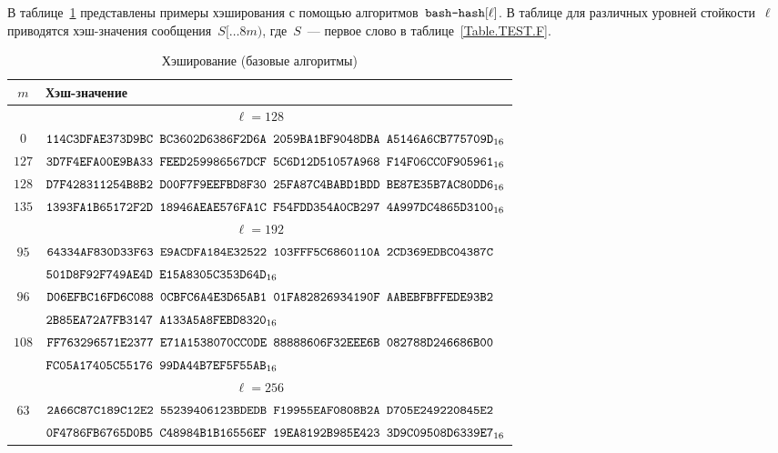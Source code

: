 \label{TEST.Hash}

В таблице~\ref{Table.TEST.Hash} представлены примеры хэширования
с помощью алгоритмов~$\texttt{bash-hash}[\ell]$.
%
В таблице для различных уровней стойкости~$\ell$ приводятся хэш-значения 
сообщения~$S[\dots 8m)$, где~$S$~--- первое слово в таблице~\ref{Table.TEST.F}.

\clearpage

\begin{table}[H]
\caption{Хэширование (базовые алгоритмы)}\label{Table.TEST.Hash}
\begin{tabular}{|c|l|}
\hline
$m$ & Хэш-значение\\
\hline
%
\hline
\multicolumn{2}{|c|}{$\ell=128$}\\
\hline
$0$ &
$\texttt{114C3DFAE373D9BC~BC3602D6386F2D6A~2059BA1BF9048DBA~A5146A6CB775709D}_{16}$\\
\hline
$127$ &
$\texttt{3D7F4EFA00E9BA33~FEED259986567DCF~5C6D12D51057A968~F14F06CC0F905961}_{16}$\\
\hline                                                        
$128$ &
$\texttt{D7F428311254B8B2~D00F7F9EEFBD8F30~25FA87C4BABD1BDD~BE87E35B7AC80DD6}_{16}$\\
\hline                                                        
$135$ &
$\texttt{1393FA1B65172F2D~18946AEAE576FA1C~F54FDD354A0CB297~4A997DC4865D3100}_{16}$\\
%
\hline
\hline
\multicolumn{2}{|c|}{$\ell=192$}\\
\hline
$95$ &
$\texttt{64334AF830D33F63~E9ACDFA184E32522~103FFF5C6860110A~2CD369EDBC04387C}$\\
&
$\texttt{501D8F92F749AE4D~E15A8305C353D64D}_{16}$\\
\hline
$96$ &
$\texttt{D06EFBC16FD6C088~0CBFC6A4E3D65AB1~01FA82826934190F~AABEBFBFFEDE93B2}$\\
&
$\texttt{2B85EA72A7FB3147~A133A5A8FEBD8320}_{16}$\\
\hline                                                        
$108$ &
$\texttt{FF763296571E2377~E71A1538070CC0DE~88888606F32EEE6B~082788D246686B00}$\\
&
$\texttt{FC05A17405C55176~99DA44B7EF5F55AB}_{16}$\\
%
\hline
\hline
\multicolumn{2}{|c|}{$\ell=256$}\\
\hline                                                        
$63$ &
$\texttt{2A66C87C189C12E2~55239406123BDEDB~F19955EAF0808B2A~D705E249220845E2}$\\
&
$\texttt{0F4786FB6765D0B5~C48984B1B16556EF~19EA8192B985E423~3D9C09508D6339E7}_{16}$\\

\end{tabular}
\end{table}
